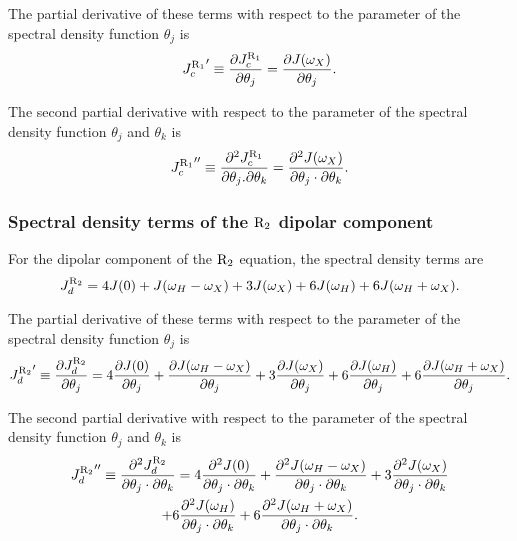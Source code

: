 \noindent The partial derivative of these terms with respect to the parameter of the spectral density function $\theta_j$ is
\begin{equation}
    {J_c^{\mathrm{R}_1}}' \equiv \frac{\partial J_c^{\mathrm{R}_1}}{\partial \theta_j}
        = \frac{\partial J(\omega_X)}{\partial \theta_j}.  \label{eq: J terms: JR1c'}
\end{equation}

\noindent The second partial derivative with respect to the parameter of the spectral density function $\theta_j$ and $\theta_k$ is
\begin{equation}
    {J_c^{\mathrm{R}_1}}'' \equiv \frac{\partial^2 J_c^{\mathrm{R}_1}}{\partial \theta_j . \partial \theta_k}
        = \frac{\partial^2 J(\omega_X)}{\partial \theta_j \cdot \partial \theta_k}.  \label{eq: J terms: JR1c"}
\end{equation}


\subsubsection{Spectral density terms of the $\mathrm{R}_2$ dipolar component}

For the dipolar component of the $\mathrm{R}_2$ equation, the spectral density terms are
\begin{equation}
    J_d^{\mathrm{R}_2} = 4J(0) + J(\omega_H - \omega_X) + 3J(\omega_X) + 6J(\omega_H) + 6J(\omega_H + \omega_X).  \label{eq: J terms: JR2d}
\end{equation}

\noindent The partial derivative of these terms with respect to the parameter of the spectral density function $\theta_j$ is
\begin{equation}
    {J_d^{\mathrm{R}_2}}' \equiv \frac{\partial J_d^{\mathrm{R}_2}}{\partial \theta_j}
        = 4 \frac{\partial J(0)}{\partial \theta_j}
        + \frac{\partial J(\omega_H - \omega_X)}{\partial \theta_j}
        + 3 \frac{\partial J(\omega_X)}{\partial \theta_j}
        + 6 \frac{\partial J(\omega_H)}{\partial \theta_j}
        + 6 \frac{\partial J(\omega_H + \omega_X)}{\partial \theta_j}.  \label{eq: J terms: JR2d'}
\end{equation}

\noindent The second partial derivative with respect to the parameter of the spectral density function $\theta_j$ and $\theta_k$ is
\begin{multline}
    {J_d^{\mathrm{R}_2}}'' \equiv \frac{\partial^2 J_d^{\mathrm{R}_2}}{\partial \theta_j \cdot \partial \theta_k}
        = 4 \frac{\partial^2 J(0)}{\partial \theta_j \cdot \partial \theta_k}
        + \frac{\partial^2 J(\omega_H - \omega_X)}{\partial \theta_j \cdot \partial \theta_k}
        + 3 \frac{\partial^2 J(\omega_X)}{\partial \theta_j \cdot \partial \theta_k} \\
        + 6 \frac{\partial^2 J(\omega_H)}{\partial \theta_j \cdot \partial \theta_k}
        + 6 \frac{\partial^2 J(\omega_H + \omega_X)}{\partial \theta_j \cdot \partial \theta_k}.  \label{eq: J terms: JR2d"}
\end{multline}


